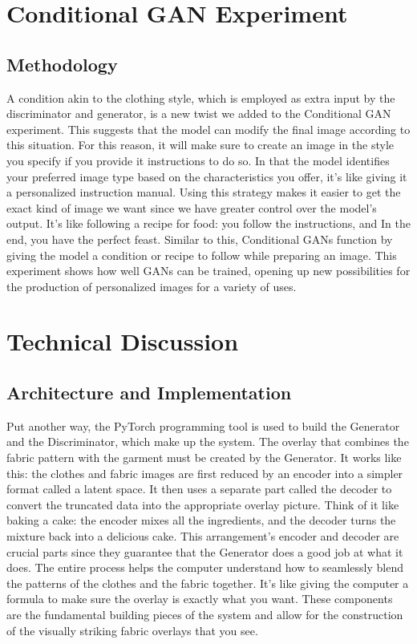 \documentclass{article}
\begin{document}
\section{Conditional GAN Experiment}

\subsection{Methodology}
A condition akin to the clothing style, which is employed as extra input by the discriminator and generator, is a new twist we added to the Conditional GAN experiment. This suggests that the model can modify the final image according to this situation. For this reason, it will make sure to create an image in the style you specify if you provide it instructions to do so. In that the model identifies your preferred image type based on the characteristics you offer, it's like giving it a personalized instruction manual.
Using this strategy makes it easier to get the exact kind of image we want since we have greater control over the model's output. It's like following a recipe for food: you follow the instructions, and In the end, you have the perfect feast. Similar to this, Conditional GANs function by giving the model a condition or recipe to follow while preparing an image. This experiment shows how well GANs can be trained, opening up new possibilities for the production of personalized images for a variety of uses.


\section{Technical Discussion}

\subsection{Architecture and Implementation}

Put another way, the PyTorch programming tool is used to build the Generator and the Discriminator, which make up the system. The overlay that combines the fabric pattern with the garment must be created by the Generator. It works like this: the clothes and fabric images are first reduced by an encoder into a simpler format called a latent space. It then uses a separate part called the decoder to convert the truncated data into the appropriate overlay picture. 
Think of it like baking a cake: the encoder mixes all the ingredients, and the decoder turns the mixture back into a delicious cake. This arrangement's encoder and decoder are crucial parts since they guarantee that the Generator does a good job at what it does. The entire process helps the computer understand how to seamlessly blend the patterns of the clothes and the fabric together. It's like giving the computer a formula to make sure the overlay is exactly what you want. These components are the fundamental building pieces of the system and allow for the construction of the visually striking fabric overlays that you see.
\end{document}
